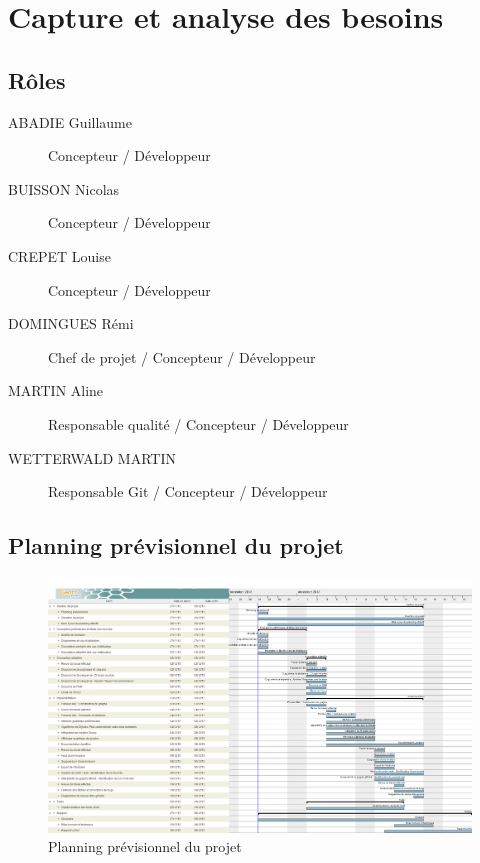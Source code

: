 \chapter{Capture et analyse des besoins}

\section{R\^oles}

\begin{description}
    \item[ABADIE Guillaume] Concepteur / D\'eveloppeur
    \item[BUISSON Nicolas] Concepteur / D\'eveloppeur
    \item[CREPET Louise] Concepteur / D\'eveloppeur
    \item[DOMINGUES R\'emi] Chef de projet / Concepteur / D\'eveloppeur
    \item[MARTIN Aline] Responsable qualit\'e / Concepteur / D\'eveloppeur
    \item[WETTERWALD MARTIN] Responsable Git / Concepteur / D\'eveloppeur
\end{description}

\section{Planning pr\'evisionnel du projet}

\begin{landscape}
\begin{figure}[h]
    \centering
    \includegraphics[width=240mm]{../diagrams/project_management/planning_previsionnel/planning_previsionnel.png}
    \caption{Planning pr\'evisionnel du projet}
    \label{diagram:planning_prevision}
\end{figure}
\end{landscape}
\pagebreak


